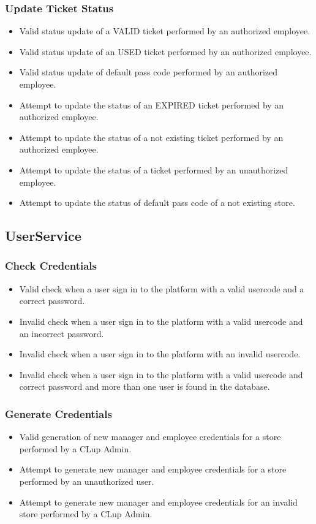 \subsubsection{Update Ticket Status}
\begin{itemize}
	\item Valid status update of a VALID ticket performed by an authorized employee.
	\item Valid status update of an USED ticket performed by an authorized employee.
	\item Valid status update of default pass code performed by an authorized employee.
	\item Attempt to update the status of an EXPIRED ticket performed by an authorized employee.
	\item Attempt to update the status of a not existing ticket performed by an authorized employee.
	\item Attempt to update the status of a ticket performed by an unauthorized employee.
	\item Attempt to update the status of default pass code of a not existing store.
\end{itemize}

\subsection{UserService}
\subsubsection{Check Credentials}
\begin{itemize}
	\item Valid check when a user sign in to the platform with a valid usercode and a correct password.
	\item Invalid check when a user sign in to the platform with a valid usercode and an incorrect password.
	\item Invalid check when a user sign in to the platform with an invalid usercode.
	\item Invalid check when a user sign in to the platform with a valid usercode and correct password and more than one user is found in the database.
\end{itemize}

\subsubsection{Generate Credentials}
\begin{itemize}
	\item Valid generation of new manager and employee credentials for a store performed by a CLup Admin.
	\item Attempt to generate new manager and employee credentials for a store performed by an unauthorized user.
	\item Attempt to generate new manager and employee credentials for an invalid store performed by a CLup Admin.
\end{itemize}

